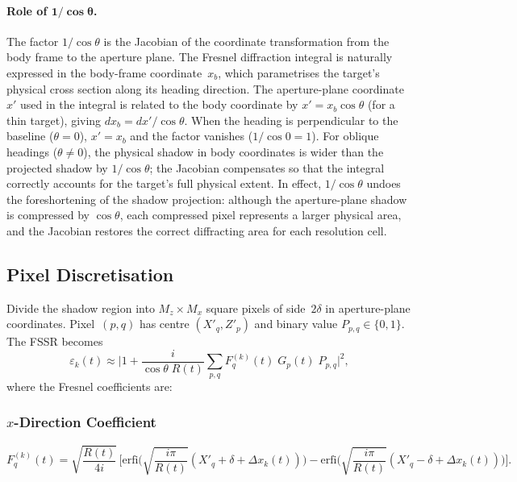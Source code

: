 \documentclass[11pt,a4paper]{article}
\newcommand{\erfi}{\mathrm{erfi}}
\begin{document}
\paragraph{Role of $\boldsymbol{1/\!\cos\theta}$.}
The factor $1/\!\cos\theta$ is the Jacobian of the coordinate
transformation from the body frame to the aperture plane.  The
Fresnel diffraction integral is naturally expressed in the body-frame
coordinate~$x_b$, which parametrises the target's physical cross
section along its heading direction.  The aperture-plane
coordinate~$x'$ used in the integral is related to the body
coordinate by $x'=x_b\cos\theta$ (for a thin target), giving
$dx_b=dx'/\!\cos\theta$.  When the heading is perpendicular to the
baseline ($\theta=0$), $x'=x_b$ and the factor vanishes
($1/\!\cos 0=1$).  For oblique headings ($\theta\ne 0$), the
physical shadow in body coordinates is wider than the projected
shadow by $1/\!\cos\theta$; the Jacobian compensates so that the
integral correctly accounts for the target's full physical extent.
In effect, $1/\!\cos\theta$ undoes the foreshortening of the shadow
projection: although the aperture-plane shadow is compressed by
$\cos\theta$, each compressed pixel represents a larger physical
area, and the Jacobian restores the correct diffracting area for
each resolution cell.

\subsection{Pixel Discretisation}

Divide the shadow region into $M_z\times M_x$ square pixels of
side~$2\delta$ in aperture-plane coordinates.  Pixel~$(p,q)$ has
centre $(X'_q,Z'_p)$ and binary value $P_{p,q}\in\{0,1\}$.  The
FSSR becomes
\begin{equation}
  \varepsilon_k(t) \approx \biggl|1
  + \frac{i}{\cos\theta\;R(t)}\sum_{p,q}
  F_q^{(k)}(t)\;G_p(t)\;P_{p,q}\biggr|^2,
  \label{eq:fssr_pixel}
\end{equation}
where the Fresnel coefficients are:

\subsubsection{$x$-Direction Coefficient}
\begin{equation}
  F_q^{(k)}(t)
  = \sqrt{\frac{R(t)}{4i}}\,\biggl[
    \erfi\!\biggl(\sqrt{\frac{i\pi}{R(t)}}
    (X'_q{+}\delta{+}\Delta x_k(t))\biggr)
  - \erfi\!\biggl(\sqrt{\frac{i\pi}{R(t)}}
    (X'_q{-}\delta{+}\Delta x_k(t))\biggr)\biggr].
  \label{eq:Fq}
\end{equation}
\end{document}

